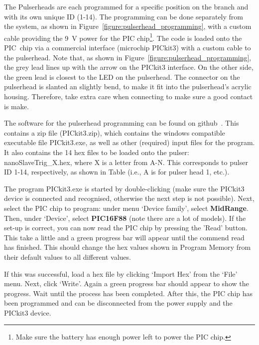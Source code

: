 The Pulserheads are each programmed for a specific position on the branch and with its own unique ID (1-14). The programming can be done separately from the system, as shown in Figure~\ref{figure:pulserhead_programming}, with a custom cable providing the 9~V power for the PIC chip\footnote{Make sure the battery has enough power left to power the PIC chip.}. The code is loaded onto the PIC~chip via a commercial interface (microchip PICkit3) with a custom cable to the pulserhead. Note that, as shown in Figure~\ref{figure:pulserhead_programming}, the grey lead lines up with the arrow on the PICkit3 interface. On the other side, the green lead is closest to the LED on the pulserhead. The connector on the pulserhead is slanted an slightly bend, to make it fit into the pulserhead's acrylic housing. Therefore, take extra care when connecting to make sure a good contact is make.

The software for the pulserhead programming can be found on github~\cite{GITHUB_PIC}. This contains a zip file (PICkit3.zip), which contains the windows compatible executable file PICkit3.exe, as well as other (required) input files for the program. It also contains the 14 hex files to be loaded onto the pulser: nanoSlaveTrig\_X.hex, where X is a letter from A-N. This corresponds to pulser ID 1-14, respectively, as shown in Table%
 (i.e., A is for pulser head 1, etc.).

The program PICkit3.exe is started by double-clicking (make sure the PICkit3 device is connected and recognised, otherwise the next step is not possible). Next, select the PIC chip to program: under menu `Device family', select {\bf MidRange}. Then, under `Device', select {\bf PIC16F88} (note there are a lot of models). If the set-up is correct, you can now read the PIC chip by pressing the 'Read' button. This take a little and a green progress bar will appear until the commend read has finished. This should change the hex values shown in Program Memory from their default values to all different values. 

If this was successful, load a hex file by clicking `Import Hex' from the `File' menu. Next, click `Write'. Again a green progress bar should appear to show the progress. Wait until the process has been completed. After this, the PIC chip has been programmed and can be disconnected from the power supply and the PICkit3 device.

